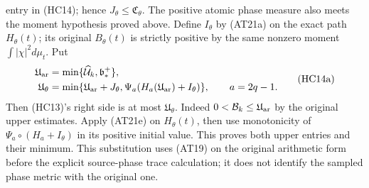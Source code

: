entry in (HC14); hence $J_\theta\le\mathfrak C_\theta$.
The positive atomic phase measure also meets the moment hypothesis
proved above. Define $I_\theta$ by (AT21a) on the exact path
$H_\theta(t)$; its original $B_\theta(t)$ is strictly positive by
the same nonzero moment $\int|\chi|^2d\mu_t$. Put
\[
\begin{aligned}
\mathfrak U_{\rm ar}&=\min\{\widehat{\mathcal U}_k,\mathfrak b_*^+\},\\
\mathfrak U_\theta&=\min\{\mathfrak U_{\rm ar}+J_\theta,
 \Psi_a(H_a(\mathfrak U_{\rm ar})+I_\theta)\},\qquad a=2q-1.
\end{aligned}\tag{HC14a}
\]
Then (HC13)'s right side is at most $\mathfrak U_\theta$.
Indeed $0<\mathcal B_k\le\mathfrak U_{\rm ar}$ by the original
upper estimates. Apply (AT21e) on $H_\theta(t)$, then use
monotonicity of $\Psi_a\circ(H_a+I_\theta)$ in its positive
initial value. This proves both upper entries and their minimum.
This substitution uses (AT19) on the original arithmetic form
before the explicit source-phase trace calculation; it does not identify
the sampled phase metric with the original one.

